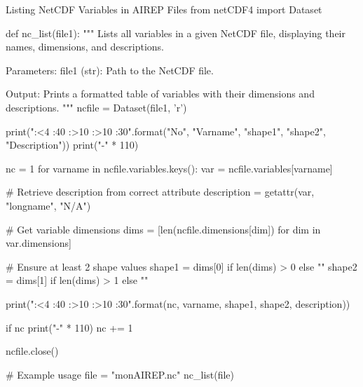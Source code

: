 \begin{codeonly}{Listing NetCDF Variables in AIREP Files}
from netCDF4 import Dataset

def nc_list(file1):
    """
    Lists all variables in a given NetCDF file, displaying their names, dimensions, and descriptions.
    
    Parameters:
    file1 (str): Path to the NetCDF file.

    Output:
    Prints a formatted table of variables with their dimensions and descriptions.
    """
    ncfile = Dataset(file1, 'r')

    print("{:<4} {:40} {:>10} {:>10}  {:30}".format("No", "Varname", "shape1", "shape2", "Description")) 
    print("-" * 110)

    nc = 1
    for varname in ncfile.variables.keys():
        var = ncfile.variables[varname]
        
        # Retrieve description from correct attribute
        description = getattr(var, "longname", "N/A")

        # Get variable dimensions
        dims = [len(ncfile.dimensions[dim]) for dim in var.dimensions]

        # Ensure at least 2 shape values
        shape1 = dims[0] if len(dims) > 0 else ""
        shape2 = dims[1] if len(dims) > 1 else ""

        print("{:<4} {:40} {:>10} {:>10}  {:30}".format(nc, varname, shape1, shape2, description))

        if nc %
            print("-" * 110)
        nc += 1

    ncfile.close()

# Example usage
file = "monAIREP.nc"
nc_list(file)
\end{codeonly}


